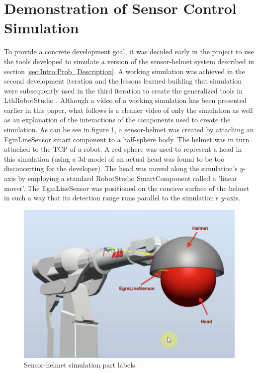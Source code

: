 \documentclass{cslthse-msc}
\begin{document}
\section{Demonstration of Sensor Control Simulation}
\label{sec:Result:Demo}
To provide a concrete development goal, it was decided early in the project to use the tools developed to simulate a version of the sensor-helmet system described in section \ref{sec:Intro:Prob_Description}. A working simulation was achieved in the second development iteration and the lessons learned building that simulation were subsequently used in the third iteration to create the generalized tools in LthRobotStudio \cite{Greg:LthRobotStudio}. Although a video of a working simulation has been presented earlier in this paper, what follows is a cleaner video of only the simulation as well as an explanation of the interactions of the components used to create the simulation. As can be see in figure \ref{fig:demo_markup}, a sensor-helmet was created by attaching an EgmLineSensor smart component to a half-sphere body. The helmet was in turn attached to the TCP of a robot. A red sphere was used to represent a head in this simulation (using a 3d model of an actual head was found to be too disconcerting for the developer). The head was moved along the simulation's $y$-axis by employing a standard RobotStudio SmartComponent called a 'linear mover'. The EgmLineSensor was positioned on the concave surface of the helmet in such a way that its detection range runs parallel to the simulation's $y$-axis. 

\begin{figure}[H]
    \centering
    \includegraphics[width=11.5cm]{Demo_markup.png}
    \caption{Sensor-helmet simulation part labels.}
    \label{fig:demo_markup}
\end{figure}
\end{document}
